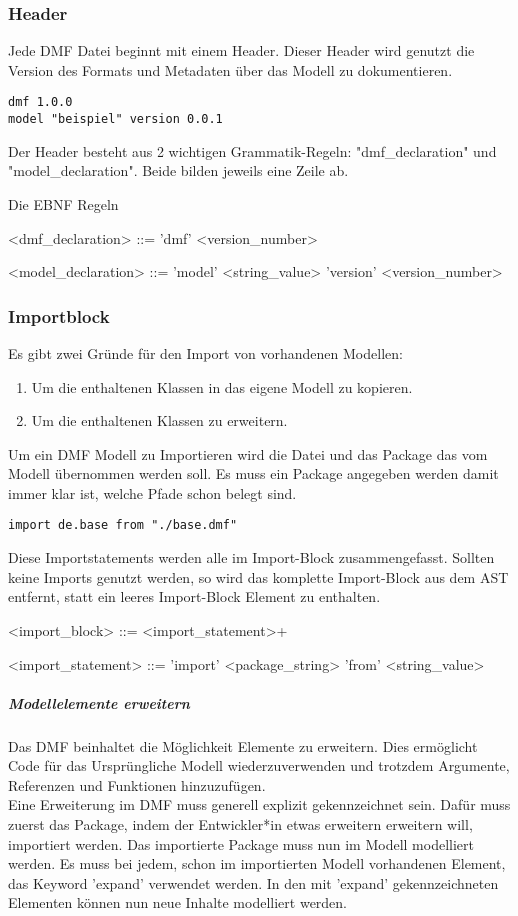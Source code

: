 \documentclass[./einleitung.tex]{subfiles}
\begin{document}
\subsubsection{Header}
Jede DMF Datei beginnt mit einem Header. Dieser Header wird genutzt die Version des Formats und Metadaten über das Modell zu dokumentieren.
\begin{lstlisting}[caption={Header einer DMF-Modelldatei}]
dmf 1.0.0
model "beispiel" version 0.0.1
\end{lstlisting}
Der Header besteht aus 2 wichtigen Grammatik-Regeln: "dmf_declaration" und "model_declaration". Beide bilden jeweils eine Zeile ab.
\begin{myenv}
\caption{Die EBNF Regeln}
\begin{grammar}
<dmf_declaration> ::= 'dmf' <version_number>

<model_declaration> ::= 'model' <string_value> 'version' <version_number>
\end{grammar}
\end{myenv}


\subsubsection{Importblock}
Es gibt zwei Gründe für den Import von vorhandenen Modellen:
\begin{enumerate}
\item Um die enthaltenen Klassen in das eigene Modell zu kopieren.
\item Um die enthaltenen Klassen zu erweitern.
\end{enumerate}
Um ein DMF Modell zu Importieren wird die Datei und das Package das vom Modell übernommen werden soll. Es muss ein Package angegeben werden damit immer klar ist, welche Pfade schon belegt sind.
\begin{lstlisting}[caption={Import des Package de.base}]
import de.base from "./base.dmf"
\end{lstlisting}
Diese Importstatements werden alle im Import-Block zusammengefasst. Sollten keine Imports genutzt werden, so wird das komplette Import-Block aus dem AST entfernt, statt ein leeres Import-Block Element zu enthalten.
\begin{grammar}
<import_block> ::= <import_statement>+

<import_statement> ::= 'import' <package_string> 'from' <string_value>
\end{grammar}

\subparagraph{Modellelemente erweitern} Das DMF beinhaltet die Möglichkeit Elemente zu erweitern. Dies ermöglicht Code für das Ursprüngliche Modell wiederzuverwenden und trotzdem Argumente, Referenzen und Funktionen hinzuzufügen. \\
Eine Erweiterung im DMF muss generell explizit gekennzeichnet sein. Dafür muss zuerst das Package, indem der Entwickler*in etwas erweitern erweitern will, importiert werden.
Das importierte Package muss nun im Modell modelliert werden. Es muss bei jedem, schon im importierten Modell vorhandenen Element, das Keyword 'expand' verwendet werden.
In den mit 'expand' gekennzeichneten Elementen können nun neue Inhalte modelliert werden.
\end{document}

